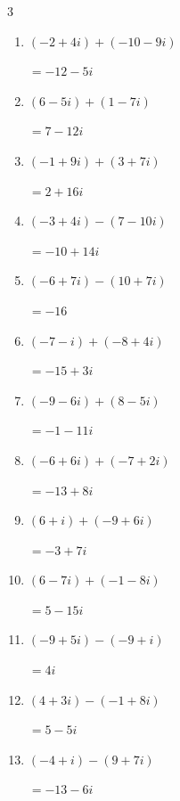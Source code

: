 \begin{multicols}{3}
\begin{enumerate}
        $\displaystyle =4-9i$

  \item $\displaystyle (-2+4i) + (-10-9i)$

        $\displaystyle =-12-5i$

  \item $\displaystyle (6-5i) + (1-7i)$

        $\displaystyle =7-12i$

  \item $\displaystyle (-1+9i) + (3+7i)$

        $\displaystyle =2+16i$

  \item $\displaystyle (-3+4i) - (7-10i)$

        $\displaystyle =-10+14i$

  \item $\displaystyle (-6+7i) - (10+7i)$

        $\displaystyle =-16$

  \item $\displaystyle (-7-i) + (-8+4i)$

        $\displaystyle =-15+3i$

  \item $\displaystyle (-9-6i) + (8-5i)$

        $\displaystyle =-1-11i$

  \item $\displaystyle (-6+6i) + (-7+2i)$

        $\displaystyle =-13+8i$

\columnbreak %

  \item $\displaystyle (6+i) + (-9+6i)$

        $\displaystyle =-3+7i$

  \item $\displaystyle (6-7i) + (-1-8i)$

        $\displaystyle =5-15i$

  \item $\displaystyle (-9+5i) - (-9+i)$

        $\displaystyle =4i$

  \item $\displaystyle (4+3i) - (-1+8i)$

        $\displaystyle =5-5i$

  \item $\displaystyle (-4+i) - (9+7i)$

        $\displaystyle =-13-6i$


\end{enumerate}
\end{multicols}
